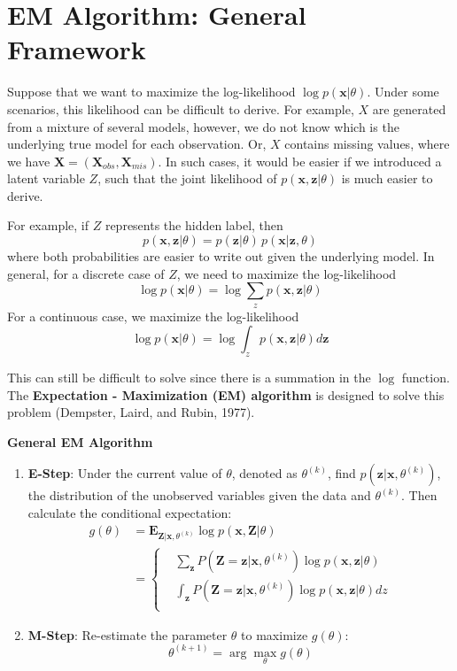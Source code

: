 \documentclass[
]{book}
\begin{document}
\section{EM Algorithm: General Framework}\label{em-algorithm-general-framework}

Suppose that we want to maximize the log-likelihood \(\log p(\mathbf{x}|\theta)\). Under some scenarios, this likelihood can be difficult to derive. For example, \(X\) are generated from a mixture of several models, however, we do not know which is the underlying true model for each observation. Or, \(X\) contains missing values, where we have \(\mathbf{X} = (\mathbf{X}_{obs}, \mathbf{X}_{mis})\). In such cases, it would be easier if we introduced a latent variable \(Z\), such that the joint likelihood of \(p(\mathbf{x}, \mathbf{z}| \theta)\) is much easier to derive.

For example, if \(Z\) represents the hidden label, then
\[p(\mathbf{x}, \mathbf{z}|\theta) = p(\mathbf{z}|\theta) \, p(\mathbf{x}|\mathbf{z}, \theta)\]
where both probabilities are easier to write out given the underlying model. In general, for a discrete case of \(Z\), we need to maximize the log-likelihood
\[\log p(\mathbf{x}|\theta) = \log \sum_z p(\mathbf{x}, \mathbf{z}|\theta)\]
For a continuous case, we maximize the log-likelihood
\[\log p(\mathbf{x}|\theta) = \log \int_z p(\mathbf{x}, \mathbf{z}|\theta) d\mathbf{z}\]

This can still be difficult to solve since there is a summation in the \(\log\) function. The \textbf{Expectation - Maximization (EM) algorithm} is designed to solve this problem (Dempster, Laird, and Rubin, 1977).

\textbf{General EM Algorithm}

\begin{enumerate}
\def\labelenumi{\arabic{enumi}.}
\item
  \textbf{E-Step}: Under the current value of \(\theta\), denoted as \(\theta^{(k)}\), find \(p(\mathbf{z}|\mathbf{x}, \theta^{(k)})\), the distribution of the unobserved variables given the
  data and \(\theta^{(k)}\). Then calculate the conditional expectation:
  \begin{align*}
  g(\theta) &= \mathbf{E}_{\mathbf{Z}|\mathbf{x},  \theta^{(k)}} \log p(\mathbf{x}, \mathbf{Z} |\theta)\\
  &= \begin{cases}
  & \sum_{\mathbf{z}} P(\mathbf{Z} = \mathbf{z}| \mathbf{x}, \theta^{(k)}) \log p(\mathbf{x}, \mathbf{z}|\theta)\\
  & \int_{\mathbf{z}} P(\mathbf{Z} = \mathbf{z}| \mathbf{x}, \theta^{(k)}) \log p(\mathbf{x}, \mathbf{z}|\theta) dz\\
  \end{cases}
  \end{align*}
\item
  \textbf{M-Step}: Re-estimate the parameter \(\theta\) to maximize \(g(\theta)\):
  \[\theta^{(k+1)} = \arg \max_{\theta} g(\theta)\]
\end{enumerate}
\end{document}
